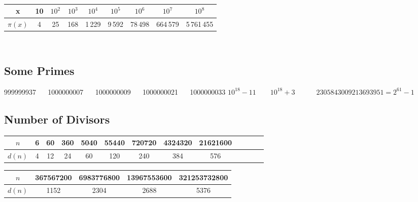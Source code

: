 \ 

\begin{tabular}{|c|c|c|c|c|c|c|c|c|}
\hline
  \cellcolor{gray!40} x&10&$10^2$&$10^3$&$10^4$&$10^5$&$10^6$&$10^7$&$10^8$\\ \hline
  \cellcolor{gray!40} $\pi(x)$& 4 & 25 & 168 & 1\,229 & 9\,592 & 78\,498 & 664\,579 & 5\,761\,455\\ \hline
\end{tabular}

\ 

\subsection{Some Primes}

999999937 $\quad$ 1000000007 $\quad$ 1000000009 $\quad$ 1000000021 $\quad$ 1000000033
$10^{18} - 11 \quad\quad 10^{18} + 3 \quad\quad\quad 2305843009213693951 = 2^{61} - 1$

\subsection{Number of Divisors}

\begin{table}[H]
    \centering
    \begin{tabular}{|c|c|c|c|c|c|c|c|c|c|c|c|c|}
        \hline
        \cellcolor{gray!40} $n$ & 6 & 60 & 360 & 5040 & 55440 & 720720 & 4324320 & 21621600 \\
        \hline
        \cellcolor{gray!40} $d(n)$ & 4 & 12 & 24 & 60 & 120 & 240 & 384 & 576 \\
        \hline
    \end{tabular}
\end{table}

\vspace{-30pt}


\begin{table}[H]
    \centering
    \begin{tabular}{|c|c|c|c|c|}
        \hline
        \cellcolor{gray!40} $n$ & 367567200 & 6983776800 & 13967553600 & 321253732800
        \\
        \hline
        \cellcolor{gray!40} $d(n)$ & 1152 & 2304 &  2688 &
        5376 \\
        \hline
    \end{tabular}
\end{table}

